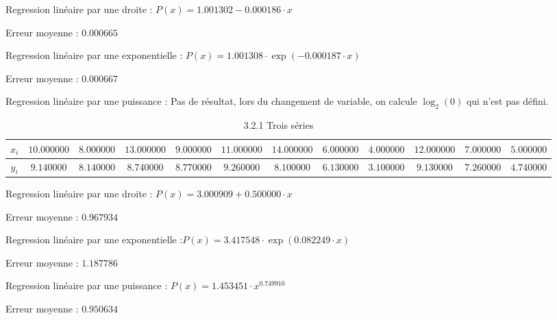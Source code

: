 \documentclass{report}
\begin{document}
	Regression linéaire par une droite : $P(x) = 1.001302 - 0.000186 \cdot x$
	
	Erreur moyenne : $0.000665$
	
	Regression linéaire par une exponentielle : $P(x) = 1.001308 \cdot \exp(-0.000187 \cdot x) $
	
	Erreur moyenne : $0.000667$
	
	Regression linéaire par une puissance : Pas de résultat, lors du changement de variable, on calcule $\log_{2}(0)$ qui n'est pas défini.
	
      \newpage
		\begin{table}[h]
	\centering
		\begin{tabular}{| c | c | c | c | c | c | c | c | c | c | c | c |}
	\hline 
	$x_{i}$ & $10.000000$ & $8.000000$ & $13.000000$ & $9.000000$ & $11.000000$ & $14.000000$ & $6.000000$ & $4.000000$ & $12.000000$ & $7.000000$ & $5.000000$ \\ 
	\hline 
	$y_{i}$ & $9.140000$ & $8.140000$ & $8.740000$ & $8.770000$ & $9.260000$ & $8.100000$ & $6.130000$ & $3.100000$ & $9.130000$ & $7.260000$ & $4.740000$ \\ 
	\hline 
	\end{tabular}	
	\caption{3.2.1 Trois séries}
	\label{Jeux d'essais interpolation 3.2.1}
		\end{table}
	Regression linéaire par une droite : $P(x) = 3.000909 + 0.500000 \cdot x$
	
	Erreur moyenne : $0.967934$
	
	Regression linéaire par une exponentielle :$P(x) = 3.417548 \cdot \exp(0.082249 \cdot x)$
	
	Erreur moyenne : $1.187786$
	
	Regression linéaire par une puissance : $P(x) = 1.453451 \cdot x^{0.749910}$
	
	Erreur moyenne : $0.950634$
	
\end{document}
